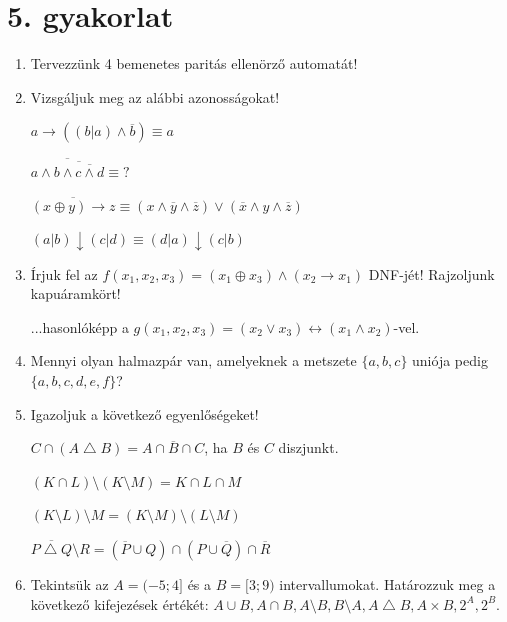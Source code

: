 \documentclass[a4paper]{article}
\begin{document}
\section*{5. gyakorlat}

\begin{enumerate}

\item

Tervezzünk 4 bemenetes paritás ellenörző automatát!

\item

Vizsgáljuk meg az alábbi azonosságokat!

$a \rightarrow ((b|a) \wedge \overline{b})
\equiv a$

$\overline{a \wedge \overline{b \wedge \overline{c \wedge d}}} \equiv ?$

$\overline{(x \oplus y) \rightarrow z} \equiv
(x \wedge \overline{y} \wedge \overline{z}) \vee
(\overline{x} \wedge y \wedge \overline{z})$

$(a|b) \downarrow (c|d) \equiv
(d|a) \downarrow (c|b)$

\item

Írjuk fel az $f(x_1, x_2, x_3) = (x_1 \oplus x_3) \wedge (x_2 \rightarrow x_1)$ DNF-jét! Rajzoljunk kapuáramkört!

...hasonlóképp a $g(x_1, x_2, x_3) = (x_2 \vee x_3) \leftrightarrow (x_1 \wedge x_2)$-vel.

\item

Mennyi olyan halmazpár van, amelyeknek a metszete $\{a, b, c\}$ uniója pedig $\{a, b, c, d, e, f\}$?

\item

Igazoljuk a következő egyenlőségeket!

$C \cap (A \bigtriangleup B) = A \cap \overline{B} \cap C$, ha $B$ és $C$ diszjunkt.

$(K \cap L) \setminus (K \setminus M) = K \cap L \cap M$

$(K \setminus L) \setminus M = (K \setminus M) \setminus (L \setminus M)$

$\overline{P \bigtriangleup Q} \setminus R = (\overline{P} \cup Q) \cap (P \cup \overline{Q}) \cap \overline{R}$

\item

Tekintsük az $A = (-5; 4]$ és a $B = [3; 9)$ intervallumokat. Határozzuk meg a következő kifejezések értékét:
$A \cup B, A \cap B, A \setminus B, B \setminus A, A \bigtriangleup B, A \times B, 2^A, 2^B$.


\end{enumerate}
\end{document}
